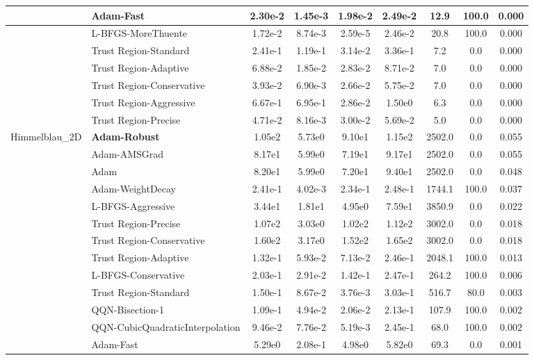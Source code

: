 \documentclass[10pt]{article}
\begin{document}
\begin{longtable}{|l|l|c|c|c|c|c|c|c|}
\hline
 & Adam-Fast & 2.30e-2 & 1.45e-3 & 1.98e-2 & 2.49e-2 & 12.9 & 100.0 & 0.000 \\
\hline
 & L-BFGS-MoreThuente & 1.72e-2 & 8.74e-3 & 2.59e-5 & 2.46e-2 & 20.8 & 100.0 & 0.000 \\
\hline
 & Trust Region-Standard & 2.41e-1 & 1.19e-1 & 3.14e-2 & 3.36e-1 & 7.2 & 0.0 & 0.000 \\
\hline
 & Trust Region-Adaptive & 6.88e-2 & 1.85e-2 & 2.83e-2 & 8.71e-2 & 7.0 & 0.0 & 0.000 \\
\hline
 & Trust Region-Conservative & 3.93e-2 & 6.90e-3 & 2.66e-2 & 5.75e-2 & 7.0 & 0.0 & 0.000 \\
\hline
 & Trust Region-Aggressive & 6.67e-1 & 6.95e-1 & 2.86e-2 & 1.50e0 & 6.3 & 0.0 & 0.000 \\
\hline
 & Trust Region-Precise & 4.71e-2 & 8.16e-3 & 3.00e-2 & 5.69e-2 & 5.0 & 0.0 & 0.000 \\
Himmelblau\_2D & \textbf{Adam-Robust} & 1.05e2 & 5.73e0 & 9.10e1 & 1.15e2 & 2502.0 & 0.0 & 0.055 \\
\hline
 & Adam-AMSGrad & 8.17e1 & 5.99e0 & 7.19e1 & 9.17e1 & 2502.0 & 0.0 & 0.055 \\
\hline
 & Adam & 8.20e1 & 5.99e0 & 7.20e1 & 9.40e1 & 2502.0 & 0.0 & 0.048 \\
\hline
 & Adam-WeightDecay & 2.41e-1 & 4.02e-3 & 2.34e-1 & 2.48e-1 & 1744.1 & 100.0 & 0.037 \\
\hline
 & L-BFGS-Aggressive & 3.44e1 & 1.81e1 & 4.95e0 & 7.59e1 & 3850.9 & 0.0 & 0.022 \\
\hline
 & Trust Region-Precise & 1.07e2 & 3.03e0 & 1.02e2 & 1.12e2 & 3002.0 & 0.0 & 0.018 \\
\hline
 & Trust Region-Conservative & 1.60e2 & 3.17e0 & 1.52e2 & 1.65e2 & 3002.0 & 0.0 & 0.018 \\
\hline
 & Trust Region-Adaptive & 1.32e-1 & 5.93e-2 & 7.13e-2 & 2.46e-1 & 2048.1 & 100.0 & 0.013 \\
\hline
 & L-BFGS-Conservative & 2.03e-1 & 2.91e-2 & 1.42e-1 & 2.47e-1 & 264.2 & 100.0 & 0.006 \\
\hline
 & Trust Region-Standard & 1.50e-1 & 8.67e-2 & 3.76e-3 & 3.03e-1 & 516.7 & 80.0 & 0.003 \\
\hline
 & QQN-Bisection-1 & 1.09e-1 & 4.94e-2 & 2.06e-2 & 2.13e-1 & 107.9 & 100.0 & 0.002 \\
\hline
 & QQN-CubicQuadraticInterpolation & 9.46e-2 & 7.76e-2 & 5.19e-3 & 2.45e-1 & 68.0 & 100.0 & 0.002 \\
\hline
 & Adam-Fast & 5.29e0 & 2.08e-1 & 4.98e0 & 5.82e0 & 69.3 & 0.0 & 0.001 \\

\end{longtable}
\end{document}
